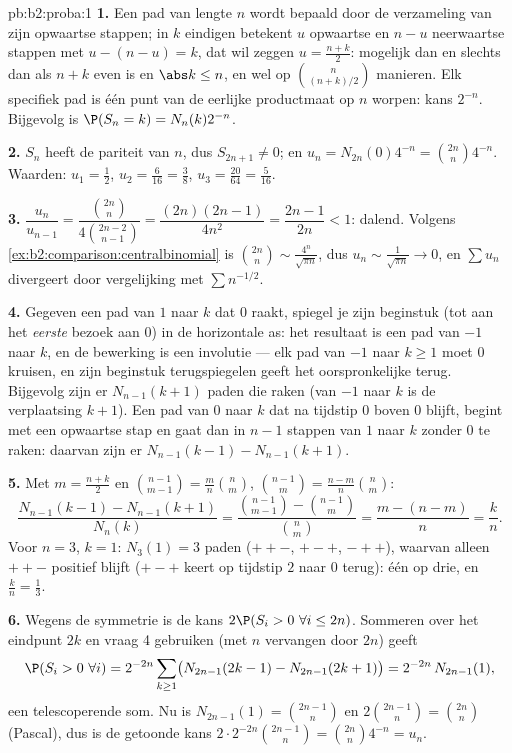 \begin{solution}{pb:b2:proba:1}
\textbf{1.} Een pad van lengte $n$ wordt bepaald door de
verzameling van zijn opwaartse stappen; in $k$ eindigen betekent
$u$ opwaartse en $n - u$ neerwaartse stappen met $u - (n - u) = k$,
dat wil zeggen $u = \frac{n+k}2$: mogelijk dan en slechts dan als
$n + k$ even is en $\abs k \leq n$, en wel op
$\binom{n}{(n+k)/2}$ manieren. Elk specifiek pad is één punt van de
eerlijke productmaat op $n$ worpen: kans $2^{-n}$. Bijgevolg is
$\P(S_n = k) = N_n(k)2^{-n}$.

\textbf{2.} $S_n$ heeft de pariteit van $n$, dus $S_{2n+1} \neq 0$;
en $u_n = N_{2n}(0)4^{-n} = \binom{2n}n4^{-n}$. Waarden: $u_1 =
\frac12$, $u_2 = \frac6{16} = \frac38$, $u_3 = \frac{20}{64} =
\frac5{16}$.

\textbf{3.} $\dfrac{u_n}{u_{n-1}} =
\dfrac{\binom{2n}n}{4\binom{2n-2}{n-1}} =
\dfrac{(2n)(2n-1)}{4n^2} = \dfrac{2n-1}{2n} < 1$: dalend. Volgens
\cref{ex:b2:comparison:centralbinomial} is $\binom{2n}n \sim
\frac{4^n}{\sqrt{\pi n}}$, dus $u_n \sim \frac1{\sqrt{\pi n}} \to
0$, en $\sum u_n$ divergeert door vergelijking met $\sum
n^{-1/2}$.

\textbf{4.} Gegeven een pad van $1$ naar $k$ dat $0$ raakt,
spiegel je zijn beginstuk (tot aan het \emph{eerste} bezoek aan
$0$) in de horizontale as: het resultaat is een pad van $-1$ naar
$k$, en de bewerking is een involutie --- elk pad van $-1$ naar $k
\geq 1$ moet $0$ kruisen, en zijn beginstuk terugspiegelen geeft
het oorspronkelijke terug. Bijgevolg zijn er $N_{n-1}(k + 1)$ paden
die raken (van $-1$ naar $k$ is de verplaatsing $k + 1$). Een pad
van $0$ naar $k$ dat na tijdstip $0$ boven $0$ blijft, begint met
een opwaartse stap en gaat dan in $n - 1$ stappen van $1$ naar $k$
zonder $0$ te raken: daarvan zijn er $N_{n-1}(k-1) -
N_{n-1}(k+1)$.

\textbf{5.} Met $m = \frac{n+k}2$ en $\binom{n-1}{m-1} = \frac
mn\binom nm$, $\binom{n-1}{m} = \frac{n-m}n\binom nm$:
\[
\frac{N_{n-1}(k-1) - N_{n-1}(k+1)}{N_n(k)}
= \frac{\binom{n-1}{m-1} - \binom{n-1}{m}}{\binom nm}
= \frac{m - (n - m)}{n} = \frac kn .
\]
Voor $n = 3$, $k = 1$: $N_3(1) = 3$ paden ($++-$, $+-+$, $-++$),
waarvan alleen $++-$ positief blijft ($+-+$ keert op tijdstip $2$
naar $0$ terug): één op drie, en $\frac kn = \frac13$.

\textbf{6.} Wegens de symmetrie is de kans $2\P(S_i > 0\ \forall i
\leq 2n)$. Sommeren over het eindpunt $2k$ en vraag 4 gebruiken
(met $n$ vervangen door $2n$) geeft
\[
\P(S_i > 0\ \forall i) = 2^{-2n}\sum_{k\geq1}
\bigl(N_{2n-1}(2k-1) - N_{2n-1}(2k+1)\bigr)
= 2^{-2n}\,N_{2n-1}(1),
\]
een telescoperende som. Nu is $N_{2n-1}(1) = \binom{2n-1}{n}$ en
$2\binom{2n-1}n = \binom{2n}n$ (Pascal), dus is de getoonde kans
$2\cdot2^{-2n}\binom{2n-1}n = \binom{2n}n4^{-n} = u_n$.


\end{solution}
